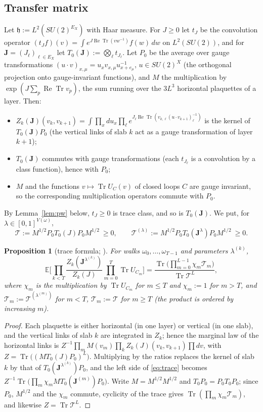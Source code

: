 \documentclass[11pt,a4paper]{article}
\theoremstyle{plain}
\newtheorem{proposition}[theorem]{Proposition}
\theoremstyle{remark}
\numberwithin{equation}{section}
\newcommand{\E}{\mathbb{E}}
\newcommand{\Tr}{\operatorname{Tr}}
\newcommand{\ReTr}{\operatorname{Re}\operatorname{Tr}}
\newcommand{\cT}{\mathcal{T}}
\newcommand{\bs}{\boldsymbol}
\begin{document}
\subsection{Transfer matrix}\label{sec:transfer}
Let $\mathfrak h:=L^2(SU(2)^{E_X})$ with Haar measure. For $J\ge0$ let $t_J$ be the convolution operator
$(t_Jf)(v)=\int e^{J\ReTr(vw^{-1})}f(w)\,dw$ on $L^2(SU(2))$, and for $\bs J=(J_\ell)_{\ell\in E_X}$ let $T_0(\bs J):=\bigotimes_\ell
t_{J_\ell}$. Let $P_0$ be the average over gauge transformations $(u\cdot v)_{x,\mu}=u_xv_{x,\mu}u_{x+e_\mu}^{-1}$, $u\in SU(2)^X$
(the orthogonal projection onto gauge-invariant functions), and $M$ the multiplication by $\exp(J\sum_p\ReTr v_p)$, the sum running
over the $3L^3$ horizontal plaquettes of a layer. Then:
\begin{itemize}
\item $Z_k(\bs J)(v_k,v_{k+1})=\int\prod_xdu_x\prod_\ell e^{J_\ell\ReTr(v_{k,\ell}(u\cdot v_{k+1})_\ell^{-1})}$ is the kernel of
$T_0(\bs J)P_0$ (the vertical links of slab $k$ act as a gauge transformation of layer $k+1$);
\item $T_0(\bs J)$ commutes with gauge transformations (each $t_{J_\ell}$ is a convolution by a class function), hence with $P_0$;
\item $M$ and the functions $v\mapsto\Tr U_C(v)$ of closed loops $C$ are gauge invariant, so the corresponding multiplication
operators commute with $P_0$.
\end{itemize}
By Lemma~\ref{lem:pw} below, $t_J\ge0$ is trace class, and so is $T_0(\bs J)$. We put, for $\lambda\in[0,1]^{V(\omega)}$,
\[
\cT:=M^{1/2}P_0T_0(J)P_0M^{1/2}\ \ge0,\qquad \cT^{(\lambda)}:=M^{1/2}P_0T_0(\bs J^\lambda)P_0M^{1/2}\ \ge0 .
\]

\begin{proposition}[trace formula; {\cite[(B.10), p.~375]{BS83}}]\label{prop:trace}
For walks $\omega_0,\dots,\omega_{T-1}$ and parameters $\lambda^{(k)}$,
\begin{equation}\label{eq:trace}
\E\Big[\prod_{k<T}\frac{Z_k(\bs J^{\lambda^{(k)}})}{Z_k(J)}\prod_{m=0}^{T}\Tr U_{C_m}\Big]=\frac{\Tr\big(\prod_{m=0}^{L-1}\chi_m\cT_m
\big)}{\Tr\cT^L},
\end{equation}
where $\chi_m$ is the multiplication by $\Tr U_{C_m}$ for $m\le T$ and $\chi_m:=1$ for $m>T$, and $\cT_m:=\cT^{(\lambda^{(m)})}$ for
$m<T$, $\cT_m:=\cT$ for $m\ge T$ (the product is ordered by increasing $m$).
\end{proposition}
\begin{proof}
Each plaquette is either horizontal (in one layer) or vertical (in one slab), and the vertical links of slab $k$ are integrated in
$Z_k$; hence the marginal law of the horizontal links is $Z^{-1}\prod_mM(v_m)\prod_kZ_k(J)(v_k,v_{k+1})\prod dv$, with
$Z=\Tr\big((MT_0(J)P_0)^L\big)$. Multiplying by the ratios replaces the kernel of slab $k$ by that of $T_0(\bs J^{\lambda^{(k)}})P_0$,
and the left side of \eqref{eq:trace} becomes $Z^{-1}\Tr\big(\prod_m\chi_mMT_0(\bs J^{(m)})P_0\big)$. Write $M=M^{1/2}M^{1/2}$ and
$T_0P_0=P_0T_0P_0$; since $P_0$, $M^{1/2}$ and the $\chi_m$ commute, cyclicity of the trace gives $\Tr(\prod_m\chi_m\cT_m)$, and
likewise $Z=\Tr\cT^L$.
\end{proof}
\end{document}
